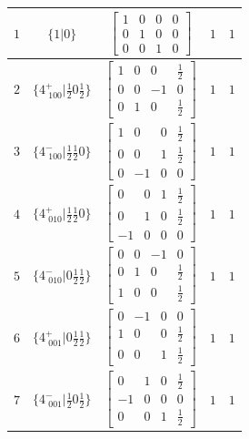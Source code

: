 \documentclass[fleqn,8pt]{jsarticle}
\begin{document}
\begin{longtable}{ccccc}
$ 1 $ & $ \{1|0\} $ & $ \begin{bmatrix} 1 & 0 & 0 & 0 \\ 0 & 1 & 0 & 0 \\ 0 & 0 & 1 & 0 \end{bmatrix} $ & $ 1 $ & $ 1 $ \\ \hline
$ 2 $ & $ \{4^{+}_{\,\,100}|\frac{1}{2} 0 \frac{1}{2}\} $ & $ \begin{bmatrix} 1 & 0 & 0 & \frac{1}{2} \\ 0 & 0 & -1 & 0 \\ 0 & 1 & 0 & \frac{1}{2} \end{bmatrix} $ & $ 1 $ & $ 1 $ \\ \hline
$ 3 $ & $ \{4^{-}_{\,\,100}|\frac{1}{2} \frac{1}{2} 0\} $ & $ \begin{bmatrix} 1 & 0 & 0 & \frac{1}{2} \\ 0 & 0 & 1 & \frac{1}{2} \\ 0 & -1 & 0 & 0 \end{bmatrix} $ & $ 1 $ & $ 1 $ \\ \hline
$ 4 $ & $ \{4^{+}_{\,\,010}|\frac{1}{2} \frac{1}{2} 0\} $ & $ \begin{bmatrix} 0 & 0 & 1 & \frac{1}{2} \\ 0 & 1 & 0 & \frac{1}{2} \\ -1 & 0 & 0 & 0 \end{bmatrix} $ & $ 1 $ & $ 1 $ \\ \hline
$ 5 $ & $ \{4^{-}_{\,\,010}|0 \frac{1}{2} \frac{1}{2}\} $ & $ \begin{bmatrix} 0 & 0 & -1 & 0 \\ 0 & 1 & 0 & \frac{1}{2} \\ 1 & 0 & 0 & \frac{1}{2} \end{bmatrix} $ & $ 1 $ & $ 1 $ \\ \hline
$ 6 $ & $ \{4^{+}_{\,\,001}|0 \frac{1}{2} \frac{1}{2}\} $ & $ \begin{bmatrix} 0 & -1 & 0 & 0 \\ 1 & 0 & 0 & \frac{1}{2} \\ 0 & 0 & 1 & \frac{1}{2} \end{bmatrix} $ & $ 1 $ & $ 1 $ \\ \hline
$ 7 $ & $ \{4^{-}_{\,\,001}|\frac{1}{2} 0 \frac{1}{2}\} $ & $ \begin{bmatrix} 0 & 1 & 0 & \frac{1}{2} \\ -1 & 0 & 0 & 0 \\ 0 & 0 & 1 & \frac{1}{2} \end{bmatrix} $ & $ 1 $ & $ 1 $ \\ \hline

\end{longtable}
\end{document}
